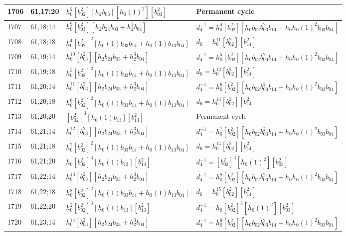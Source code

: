 \documentclass{article}
\begin{document}
\begin{longtable}{|l|l|>{\raggedright\arraybackslash}p{6cm}|>{\raggedright\arraybackslash}p{6cm}|}
\hline
1706 & 61,17;20 & $h_0^2[b_{02}^2][h_2b_{03}][h_0(1)^2][b_{03}^2]$ & Permanent cycle\\
\hline
1707 & 61,18;14 & $h_0^9[b_{03}^2][h_2b_{24}b_{03} + h_2^3b_{04}]$ & $d_{4}^{-1}=h_0^4[b_{02}^2][h_0b_{02}b_{03}^2b_{14} + h_0h_0(1)^2b_{03}b_{04}]$\\
\hline
1708 & 61,18;18 & $h_0^4[b_{02}^2]^2[h_0(1)b_{03}b_{14} + h_0(1)b_{13}b_{04}]$ &$d_{6}=h_0^{11}[b_{02}^2][b_{14}^2]$\\
\hline
1709 & 61,19;14 & $h_0^{10}[b_{03}^2][h_2b_{24}b_{03} + h_2^3b_{04}]$ & $d_{4}^{-1}=h_0^5[b_{02}^2][h_0b_{02}b_{03}^2b_{14} + h_0h_0(1)^2b_{03}b_{04}]$\\
\hline
1710 & 61,19;18 & $h_0^5[b_{02}^2]^2[h_0(1)b_{03}b_{14} + h_0(1)b_{13}b_{04}]$ &$d_{6}=h_0^{12}[b_{02}^2][b_{14}^2]$\\
\hline
1711 & 61,20;14 & $h_0^{11}[b_{03}^2][h_2b_{24}b_{03} + h_2^3b_{04}]$ & $d_{4}^{-1}=h_0^6[b_{02}^2][h_0b_{02}b_{03}^2b_{14} + h_0h_0(1)^2b_{03}b_{04}]$\\
\hline
1712 & 61,20;18 & $h_0^6[b_{02}^2]^2[h_0(1)b_{03}b_{14} + h_0(1)b_{13}b_{04}]$ &$d_{6}=h_0^{13}[b_{02}^2][b_{14}^2]$\\
\hline
1713 & 61,20;20 & $[b_{02}^2]^3[h_0(1)b_{13}][b_{13}^2]$ & Permanent cycle\\
\hline
1714 & 61,21;14 & $h_0^{12}[b_{03}^2][h_2b_{24}b_{03} + h_2^3b_{04}]$ & $d_{4}^{-1}=h_0^7[b_{02}^2][h_0b_{02}b_{03}^2b_{14} + h_0h_0(1)^2b_{03}b_{04}]$\\
\hline
1715 & 61,21;18 & $h_0^7[b_{02}^2]^2[h_0(1)b_{03}b_{14} + h_0(1)b_{13}b_{04}]$ &$d_{6}=h_0^{14}[b_{02}^2][b_{14}^2]$\\
\hline
1716 & 61,21;20 & $h_0[b_{02}^2]^3[h_0(1)b_{13}][b_{13}^2]$ & $d_{4}^{-1}=[b_{02}^2]^3[h_0(1)^2][b_{03}^2]$\\
\hline
1717 & 61,22;14 & $h_0^{13}[b_{03}^2][h_2b_{24}b_{03} + h_2^3b_{04}]$ & $d_{4}^{-1}=h_0^8[b_{02}^2][h_0b_{02}b_{03}^2b_{14} + h_0h_0(1)^2b_{03}b_{04}]$\\
\hline
1718 & 61,22;18 & $h_0^8[b_{02}^2]^2[h_0(1)b_{03}b_{14} + h_0(1)b_{13}b_{04}]$ &$d_{6}=h_0^{15}[b_{02}^2][b_{14}^2]$\\
\hline
1719 & 61,22;20 & $h_0^2[b_{02}^2]^3[h_0(1)b_{13}][b_{13}^2]$ & $d_{4}^{-1}=h_0[b_{02}^2]^3[h_0(1)^2][b_{03}^2]$\\
\hline
1720 & 61,23;14 & $h_0^{14}[b_{03}^2][h_2b_{24}b_{03} + h_2^3b_{04}]$ & $d_{4}^{-1}=h_0^9[b_{02}^2][h_0b_{02}b_{03}^2b_{14} + h_0h_0(1)^2b_{03}b_{04}]$\\

\end{longtable}
\end{document}
